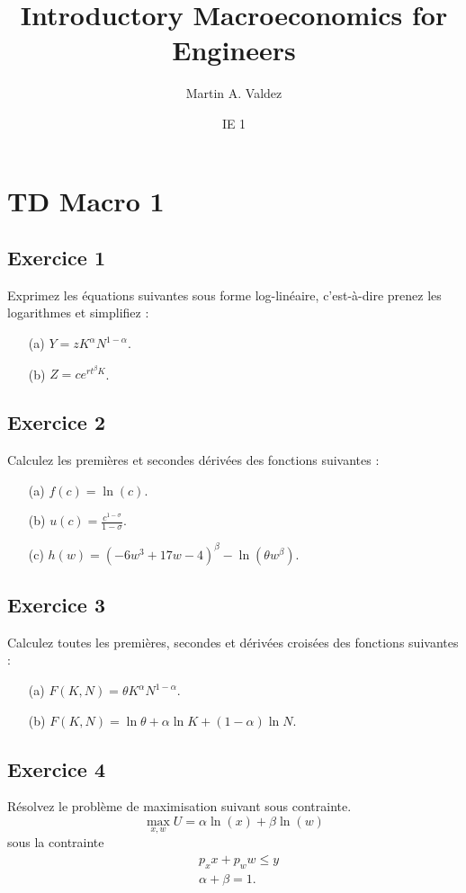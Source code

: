 \documentclass[11pt]{article}
\title{Introductory Macroeconomics for Engineers}
\author{Martin A. Valdez}
\date{IE 1}
\begin{document}
\maketitle

\section*{TD Macro 1}

\subsection*{Exercice 1}
Exprimez les équations suivantes sous forme log-linéaire, c'est-à-dire prenez les logarithmes et simplifiez :
\begin{enumerate}
    \item[(a)] \(Y = zK^\alpha N^{1-\alpha}\).
    \item[(b)] \(Z = ce^{rt^\beta K}\).
\end{enumerate}

\subsection*{Exercice 2}
Calculez les premières et secondes dérivées des fonctions suivantes :
\begin{enumerate}
    \item[(a)] \(f(c) = \ln(c)\).
    \item[(b)] \(u(c) = \frac{c^{1-\sigma}}{1-\sigma}\).
    \item[(c)] \(h(w) = (-6w^3 + 17w - 4)^\beta - \ln(\theta w^\beta)\).
\end{enumerate}

\subsection*{Exercice 3}
Calculez toutes les premières, secondes et dérivées croisées des fonctions suivantes :
\begin{enumerate}
    \item[(a)] \(F(K, N) = \theta K^\alpha N^{1-\alpha}\).
    \item[(b)] \(F(K, N) = \ln \theta + \alpha \ln K + (1 - \alpha) \ln N\).
\end{enumerate}

\subsection*{Exercice 4}
Résolvez le problème de maximisation suivant sous contrainte.
\[
\max_{x,w} U = \alpha \ln(x) + \beta \ln(w) 
\]
sous la contrainte
\begin{align*}
    &p_x x + p_w w \leq y \\
    &\alpha + \beta = 1.
\end{align*}
\end{document}
